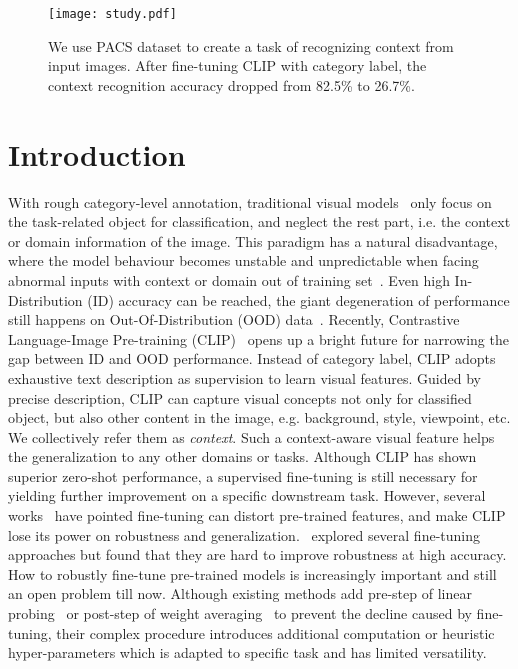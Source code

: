 \documentclass[pdflatex,sn-basic,iicol]{sn-jnl}
\theoremstyle{thmstyleone}\newtheorem{theorem}{Theorem}\newtheorem{proposition}[theorem]{Proposition}
\theoremstyle{thmstyletwo}\newtheorem{example}{Example}\newtheorem{remark}{Remark}
\theoremstyle{thmstylethree}\newtheorem{definition}{Definition}
\begin{document}





\maketitle

\begin{figure*}[t]
    \centering
    \texttt{[image: study.pdf]}
    \caption{We use PACS dataset to create a task of recognizing context from input images. After fine-tuning CLIP with category label, the context recognition accuracy dropped from 82.5\% to 26.7\%. }
    \label{fig:study}
\end{figure*}

\section{Introduction} \label{sec:intro}
With rough category-level annotation, traditional visual models~\citep{he2016deep,krizhevsky2017imagenet} only focus on the task-related object for classification, and neglect the rest part, i.e. the context or domain information of the image. This paradigm has a natural disadvantage, where the model behaviour becomes unstable and unpredictable when facing abnormal inputs with context or domain out of training set~\citep{he2021towards,zhang2022nico++,moreno2012unifying}. Even high In-Distribution (ID) accuracy can be reached, the giant degeneration of performance still happens on Out-Of-Distribution (OOD) data~\citep{taori2020measuring,hendrycks2021many}. 
Recently, Contrastive Language-Image Pre-training (CLIP)~\citep{radford2021learning} opens up a bright future for narrowing the gap between ID and OOD performance. Instead of category label, CLIP adopts exhaustive text description as supervision to learn visual features. Guided by precise description, CLIP can capture visual concepts not only for classified object, but also other content in the image, e.g. background, style, viewpoint, etc. We collectively refer them as \textit{context}. Such a context-aware visual feature helps the generalization to any other domains or tasks. 
Although CLIP has shown superior zero-shot performance, a supervised fine-tuning is still necessary for yielding further improvement on a specific downstream task. However, several works~\citep{kumar2021fine,wortsman2022robust} have pointed fine-tuning can distort pre-trained features, and make CLIP lose its power on robustness and generalization.~\citet{andreassen2021evolution} explored several fine-tuning approaches but found that they are hard to improve robustness at high accuracy. How to robustly fine-tune pre-trained models is increasingly important and still an open problem till now. Although existing methods add pre-step of linear probing~\citep{kumar2021fine} or post-step of weight averaging~\citep{wortsman2022robust} to prevent the decline caused by fine-tuning, their complex procedure introduces additional computation or heuristic hyper-parameters which is adapted to specific task and has limited versatility.
\end{document}

